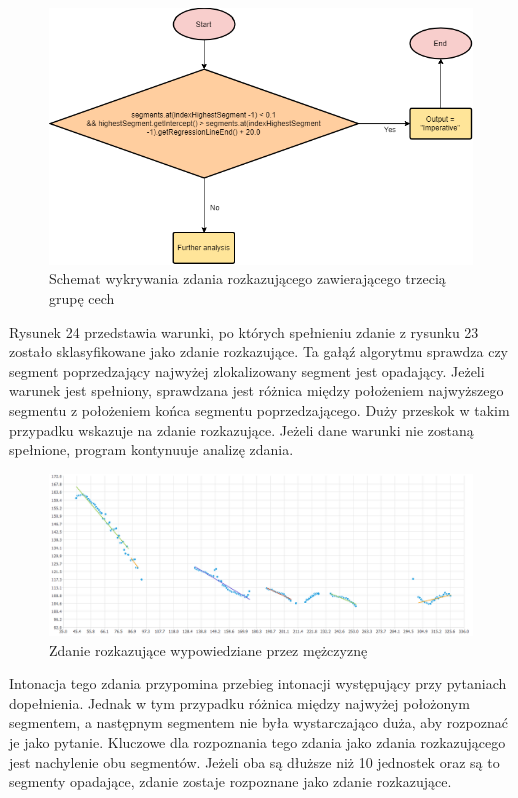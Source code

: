 \documentclass[a4paper,12 pt]{report}
\begin{document}
\begin{figure}[h]
\centering
\includegraphics[scale=0.85]{Imperative3.png}
\caption{Schemat wykrywania zdania rozkazującego zawierającego trzecią grupę cech}
\end{figure}
\FloatBarrier
Rysunek 24 przedstawia warunki, po których spełnieniu zdanie z rysunku 23 zostało sklasyfikowane jako zdanie rozkazujące. Ta gałąź algorytmu sprawdza czy segment poprzedzający najwyżej zlokalizowany segment jest opadający. Jeżeli warunek jest spełniony, sprawdzana jest różnica między położeniem najwyższego segmentu z położeniem końca segmentu poprzedzającego. Duży przeskok w takim przypadku wskazuje na zdanie rozkazujące. Jeżeli dane warunki nie zostaną spełnione, program kontynuuje analizę zdania.
 \FloatBarrier
\begin{figure}[h]
\centering
\includegraphics[scale=0.6]{rozkaz_4.png}
\caption{Zdanie rozkazujące wypowiedziane przez mężczyznę}
\end{figure}
\FloatBarrier
Intonacja tego zdania przypomina przebieg intonacji występujący przy pytaniach dopełnienia. Jednak w tym przypadku różnica między najwyżej położonym segmentem, a następnym segmentem nie była wystarczająco duża, aby rozpoznać je jako pytanie. Kluczowe dla rozpoznania tego zdania jako zdania rozkazującego jest nachylenie obu segmentów. Jeżeli oba są dłuższe niż 10 jednostek oraz są to segmenty opadające, zdanie zostaje rozpoznane jako zdanie rozkazujące.
\end{document}
